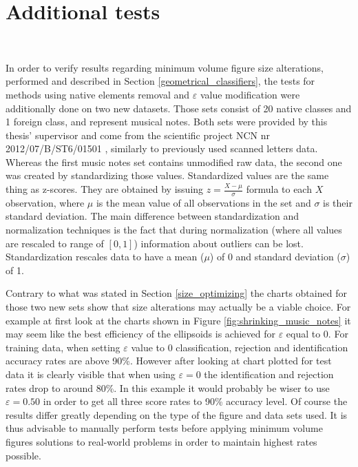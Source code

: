 \section{Additional tests} \ \label{additional_tests}

In order to verify results regarding minimum volume figure size alterations, performed and described in Section \ref{geometrical_classifiers}, the tests for methods using native elements removal and $\varepsilon$ value modification were additionally done on two new datasets. Those sets consist of 20 native classes and 1 foreign class, and represent musical notes. Both sets were provided by this thesis' supervisor and come from the scientific project NCN nr 2012/07/B/ST6/01501 \cite{ScannedDigits}, similarly to previously used scanned letters data. Whereas the first music notes set contains unmodified raw data, the second one was created by standardizing those values. Standardized values are the same thing as z-scores. They are obtained by issuing $z = \frac{X - \mu}{\sigma}$ formula to each $X$ observation, where $\mu$ is the mean value of all observations in the set and $\sigma$ is their standard deviation. The main difference between standardization and normalization techniques is the fact that during normalization (where all values are rescaled to range of $[0, 1]$) information about outliers can be lost. Standardization rescales data to have a mean ($\mu$) of 0 and standard deviation ($\sigma$) of 1.

Contrary to what was stated in Section \ref{size_optimizing} the charts obtained for those two new sets show that size alterations may actually be a viable choice. For example at first look at the charts shown in Figure \ref{fig:shrinking_music_notes} it may seem like the best efficiency of the ellipsoids is achieved for $\varepsilon$ equal to 0. For training data, when setting $\varepsilon$ value to 0 classification, rejection and identification accuracy rates are above 90\%. However after looking at chart plotted for test data it is clearly visible that when using $\varepsilon = 0$ the identification and rejection rates drop to around 80\%. In this example it would probably be wiser to use $\varepsilon = 0.50$ in order to get all three score rates to 90\% accuracy level. Of course the results differ greatly depending on the type of the figure and data sets used. It is thus advisable to manually perform tests before applying minimum volume figures solutions to real-world problems in order to maintain highest rates possible.

